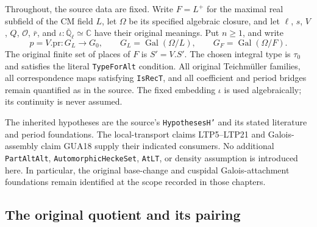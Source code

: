 \documentclass[11pt,a4paper]{article}
\numberwithin{equation}{section}
\theoremstyle{remark}\newtheorem{remark}[theorem]{Remark}
\begin{document}
Throughout, the source data are fixed.  Write $F=L^+$ for the maximal
real subfield of the CM field $L$, let $\Omega$ be its specified
algebraic closure, and let $\ell$, $s$, $V$, $Q$, $\mathcal O$,
$\bar r$, and $\iota:\overline{\mathbb Q}_\ell\simeq\mathbb C$
have their original meanings.  Put $n\geq1$, and write
\[
 p=V.\mathrm{pr}:G_L\longrightarrow G_0,\qquad
 G_L=\operatorname{Gal}(\Omega/L),\qquad
 G_F=\operatorname{Gal}(\Omega/F).
\]
The original finite set of places of $F$ is $S'=V.S'$.
The chosen integral type is $\tau_0$ and satisfies the literal
\texttt{Type\allowbreak For\allowbreak Alt} condition.  All original Teichm\"uller families,
all correspondence maps satisfying \texttt{Is\allowbreak Rec\allowbreak T}, and all coefficient
and period bridges remain quantified as in the source.  The fixed
embedding $\iota$ is used algebraically; its continuity is never assumed.

The inherited hypotheses are the source's
\texttt{Hypotheses\allowbreak H'} and its stated literature and period foundations.
The local-transport claims LTP5--LTP21 and Galois-assembly claim GUA18 supply their indicated
consumers.  No additional \texttt{Part\allowbreak Alt\allowbreak Alt},
\texttt{Automorphic\allowbreak Hecke\allowbreak Set}, \texttt{At\allowbreak LT}, or density assumption is
introduced here.  In particular, the original base-change and
cuspidal Galois-attachment foundations remain identified at the scope
recorded in those chapters.

\subsection{The original quotient and its pairing}

\end{document}
